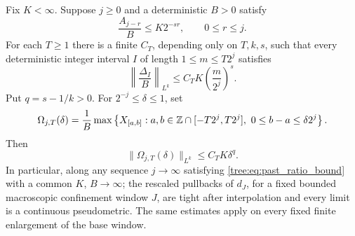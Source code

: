 \begin{lemma}\label{tree:lem:moment_compactness}
Fix $K<\infty$. Suppose $j\geq0$ and a deterministic $B>0$ satisfy
\begin{equation}\label{tree:eq:past_ratio_bound}
 \frac{A_{j-r}}{B}\leq K2^{-sr},\qquad 0\leq r\leq j.
\end{equation}
For each $T\geq1$ there is a finite $C_T$, depending only on
$T,k,s$, such that every deterministic integer interval $I$ of length
$1\leq m\leq T2^j$ satisfies
\begin{equation}\label{tree:eq:internal_diameter_bound}
 \left\|\frac{\Delta_I}{B}\right\|_{L^k}
 \leq C_TK\left(\frac{m}{2^j}\right)^s.
\end{equation}
Put $q=s-1/k>0$. For $2^{-j}\leq\delta\leq1$, set
\[
 \Omega_{j,T}(\delta)=\frac1B
 \max\left\{X_{[a,b]}:
  a,b\in\mathbb Z\cap[-T2^j,T2^j],\ 0\leq b-a\leq\delta2^j\right\}.
\]
Then
\begin{equation}\label{tree:eq:uniform_time_modulus}
 \|\Omega_{j,T}(\delta)\|_{L^k}\leq C_TK\delta^q.
\end{equation}
In particular, along any sequence $j\to\infty$ satisfying
\eqref{tree:eq:past_ratio_bound} with a common $K$, $B\to\infty$;
the rescaled pullbacks of $d_J$, for a fixed bounded macroscopic
confinement window $J$, are tight after interpolation and every
limit is a continuous pseudometric. The same estimates apply on every fixed finite
enlargement of the base window.
\end{lemma}

